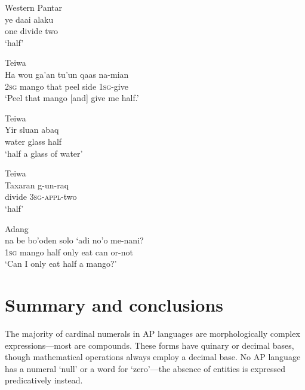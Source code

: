 \ea%
\label{bkm:Ref342746708}
{\upshape Western Pantar}\\
\gll  ye  daai  alaku   \\  
    one  divide  two    \\
\glt  `half' 
\z








\ea%
\label{bkm:Ref342746924}
{\upshape Teiwa}\\
\gll  Ha  wou  ga'an  tu'un  qaas  na-mian \\  
     \textsc{2sg} mango  that  peel  side  \textsc{1sg}{}-give \\
\glt  `Peel that mango [and] give me half.'
\z








\ea%
\label{bkm:Ref342746926}
{\upshape Teiwa}\\
\gll   Yir  sluan  abaq   \\  
    water  glass  half      \\
\glt  `half a glass of water'
\z

               

              




\ea%
\label{bkm:Ref342746963}
{\upshape Teiwa}\\
\gll   Taxaran  g-un-raq   \\  
   divide  \textsc{3sg}-\textsc{appl}-two      \\
\glt `half' 
\z

               

               
\ea
\label{ex:8:1250}
{\upshape Adang}\\
\gll na  be  bo'oden  solo  `adi  no'o  me-nani? \\
  1\textsc{sg } mango  half  only  eat  can  or-not\\
\glt `Can I only eat half a mango?'
\z
 
 

 

\section{Summary and conclusions}
\label{sec:8:Summary}
The majority of cardinal numerals in AP languages are morphologically complex expressions---most are compounds. These forms have quinary or decimal bases, though mathematical operations always employ a decimal base. No AP language has a numeral `null' or a word for `zero'---the absence of entities is expressed predicatively instead.

